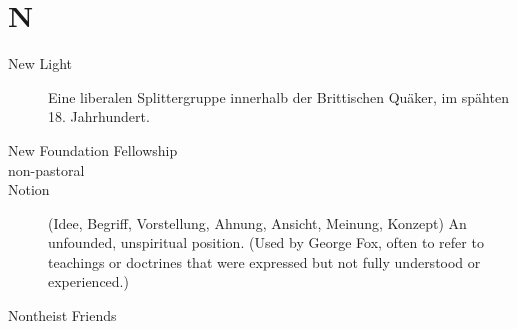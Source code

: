 \section*{N}

\articlesize

\begin{description}

\item[New Light] Eine liberalen Splittergruppe innerhalb der Brittischen Quäker,
im spähten 18. Jahrhundert.


 \item[New Foundation Fellowship]

\item[non-pastoral] 

\item[Notion] (Idee, Begriff, Vorstellung, Ahnung, Ansicht, Meinung, Konzept)
    An unfounded, unspiritual position. (Used by George Fox, often to refer to teachings or doctrines that were expressed but not fully understood or experienced.)


 \item[Nontheist Friends]

 \end{description}

\normalsize
